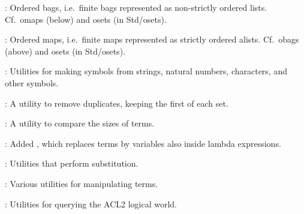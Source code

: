
\begin{frame}

\newlibtitle

:
Ordered bags, i.e.\ finite bags represented as non-strictly ordered lists.
Cf.\ omaps (below) and osets (in Std/osets).

\separation

:
Ordered maps, i.e.\ finite maps represented as strictly ordered alists.
Cf.\ obags (above) and osets (in Std/osets).

\separation

:
Utilities for making symbols from strings, natural numbers, characters, and other symbols.

\separation

:
A utility to remove duplicates, keeping the first of each set.

\end{frame}


\begin{frame}

\newlibtitle

:
A utility to compare the sizes of terms.

\separation

:
Added ,
which replaces terms by variables also inside lambda expressions.

\separation

:
Utilities that perform substitution.

\separation

:
Various utilities for manipulating terms.

\separation

:
Utilities for querying the ACL2 logical world.

\end{frame}


